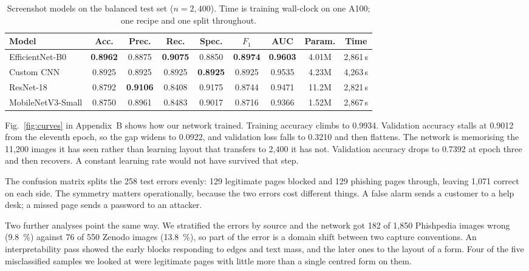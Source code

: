 \documentclass[11pt,journal,a4paper]{IEEEtran}
\newcommand{\tabfont}{\fontsize{11}{13}\selectfont}
\begin{document}
\begin{table}[!t]
\centering
\caption{Screenshot models on the balanced test set ($n=2{,}400$). Time is training wall-clock on one A100; one
recipe and one split throughout.}
\label{tab:img}
\tabfont
\setlength{\tabcolsep}{4pt}
\begin{tabular}{@{}lcccccccc@{}}
\toprule
\textbf{Model} & \textbf{Acc.} & \textbf{Prec.} & \textbf{Rec.} & \textbf{Spec.} & \textbf{$F_1$} & \textbf{AUC} & \textbf{Param.} & \textbf{Time} \\
\midrule
EfficientNet-B0   & \textbf{0.8962} & 0.8875 & \textbf{0.9075} & 0.8850 & \textbf{0.8974} & \textbf{0.9603} & 4.01M & 2{,}861\,s \\
Custom CNN        & 0.8925 & 0.8925 & 0.8925 & \textbf{0.8925} & 0.8925 & 0.9535 & 4.23M & 4{,}263\,s \\
ResNet-18         & 0.8792 & \textbf{0.9106} & 0.8408 & 0.9175 & 0.8744 & 0.9471 & 11.2M & 2{,}821\,s \\
MobileNetV3-Small & 0.8750 & 0.8961 & 0.8483 & 0.9017 & 0.8716 & 0.9366 & 1.52M & 2{,}867\,s \\
\bottomrule
\end{tabular}
\end{table}

Fig.~\ref{fig:curves} in Appendix~B shows how our network trained. Training accuracy climbs to 0.9934. Validation accuracy stalls at 0.9012 from the eleventh epoch, so the gap
widens to 0.0922, and validation loss falls to 0.3210 and then flattens. The network is memorising the 11{,}200 images it has seen rather than learning layout that transfers to 2{,}400 it has not. Validation accuracy drops to 0.7392 at epoch
three and then recovers. A constant learning rate would not have
survived that step.

The confusion matrix splits the 258 test errors evenly: 129 legitimate pages blocked and 129 phishing pages
through, leaving 1{,}071 correct on each side. The symmetry matters operationally, because the two errors cost
different things. A false alarm sends a customer to a help desk; a missed page sends a password to an attacker.

Two further analyses point the same way. We stratified the errors by source and the network got 182 of 1{,}850
Phishpedia images wrong (9.8~\%) against 76 of 550 Zenodo images (13.8~\%), so part of the error is a domain shift
between two capture conventions. An interpretability pass showed the early blocks responding to edges and text
mass, and the later ones to the layout of a form. Four of the five misclassified samples we looked at were
legitimate pages with little more than a single centred form on them.
\end{document}
